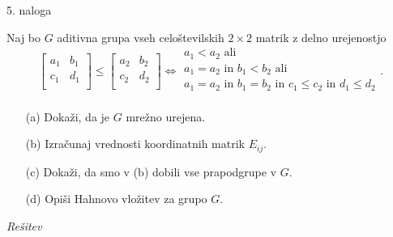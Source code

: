\documentclass[a4paper, 12pt]{article}
\begin{document}
\begin{flushleft}
5. naloga
\end{flushleft}
Naj bo $G$ aditivna  grupa vseh celoštevilskih $2\times 2$ matrik z delno urejenostjo
$$
\begin{bmatrix}
a_1 & b_1 \\
c_1 & d_1 \\
\end{bmatrix}
\le 
\begin{bmatrix}
a_2 & b_2 \\
c_2 & d_2 \\
\end{bmatrix}
\Leftrightarrow
\begin{array}{l}
a_1 < a_2 \text{ ali}\\
a_1 = a_2 \text{ in } b_1 < b_2 \text{ ali}\\
a_1 = a_2 \text{ in } b_1 = b_2 \text{ in } c_1 \le c_2 \text{ in } d_1 \le d_2\\
\end{array}.
$$
\begin{enumerate}
\item[(a)] Dokaži, da je $G$ mrežno urejena.
\item[(b)] Izračunaj vrednosti koordinatnih matrik $E_{ij}$.
\item[(c)] Dokaži, da smo v (b) dobili vse prapodgrupe  v $G$.
\item[(d)] Opiši Hahnovo vložitev za grupo $G$.
\end{enumerate}
\emph{Rešitev}
\end{document}

